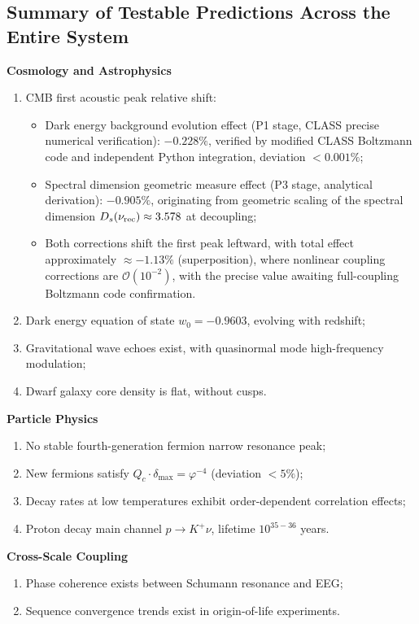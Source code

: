 \documentclass[12pt,a4paper,twocolumn]{article}
\renewcommand{\phi}{\varphi}
\begin{document}
\subsection{Summary of Testable Predictions Across the Entire System}
\textbf{Cosmology and Astrophysics}
\begin{enumerate}
\item CMB first acoustic peak relative shift:
  \begin{itemize}
  \item Dark energy background evolution effect (P1 stage, CLASS precise numerical verification): $\mathbf{-0.228\%}$, verified by modified CLASS Boltzmann code and independent Python integration, deviation $<0.001\%$;
  \item Spectral dimension geometric measure effect (P3 stage, analytical derivation): $\mathbf{-0.905\%}$, originating from geometric scaling of the spectral dimension $D_s(\nu_{\rm rec})\approx3.578$ at decoupling;
  \item Both corrections shift the first peak leftward, with total effect approximately $\mathbf{\approx -1.13\%}$ (superposition), where nonlinear coupling corrections are $\mathcal{O}(10^{-2})$, with the precise value awaiting full-coupling Boltzmann code confirmation.
  \end{itemize}
\item Dark energy equation of state $w_0 = -0.9603$, evolving with redshift;
\item Gravitational wave echoes exist, with quasinormal mode high-frequency modulation;
\item Dwarf galaxy core density is flat, without cusps.
\end{enumerate}

\textbf{Particle Physics}
\begin{enumerate}
\item No stable fourth-generation fermion narrow resonance peak;
\item New fermions satisfy $Q_c \cdot \delta_{\max} = \phi^{-4}$ (deviation $<5\%$);
\item Decay rates at low temperatures exhibit order-dependent correlation effects;
\item Proton decay main channel $p \to K^+ \nu$, lifetime $10^{35-36}$ years.
\end{enumerate}

\textbf{Cross-Scale Coupling}
\begin{enumerate}
\item Phase coherence exists between Schumann resonance and EEG;
\item Sequence convergence trends exist in origin-of-life experiments.
\end{enumerate}
\end{document}
